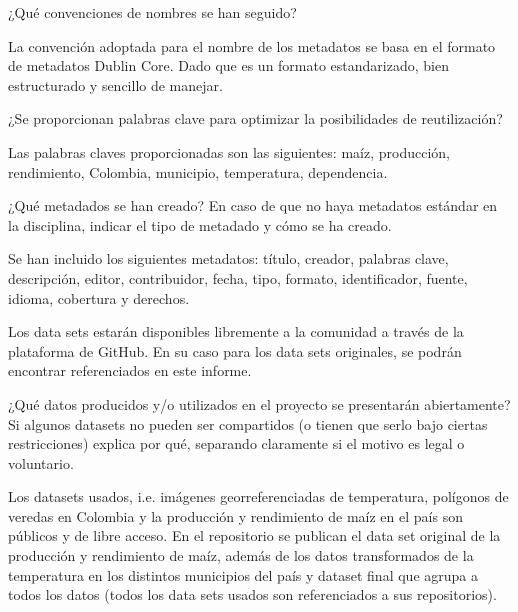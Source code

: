 \documentclass[12pt, spanish]{article}
\begin{document}
\begin{shaded}
¿Qué convenciones de nombres se han seguido?
\end{shaded}

La convención adoptada para el nombre de los metadatos se basa en el formato de metadatos Dublin Core. Dado que es un formato estandarizado, bien estructurado y sencillo de manejar.
\begin{shaded}
¿Se proporcionan palabras clave para optimizar la posibilidades de reutilización?
\end{shaded}
Las palabras claves proporcionadas son las siguientes: maíz, producción, rendimiento, Colombia, municipio, temperatura, dependencia.

\begin{shaded}
¿Qué metadados se han creado? En caso de que no haya metadatos estándar en la disciplina, indicar el tipo de metadado y cómo se ha creado.
\end{shaded}
Se han incluido los siguientes metadatos: título, creador, palabras clave, descripción, editor, contribuidor, fecha, tipo, formato, identificador, fuente, idioma, cobertura y derechos.


Los data sets estarán disponibles libremente a la comunidad a través de la plataforma de GitHub. En su caso para los data sets originales, se podrán encontrar referenciados en este informe.

\begin{shaded}
¿Qué datos producidos y/o utilizados en el proyecto se presentarán abiertamente? Si algunos datasets no pueden ser compartidos (o tienen que serlo bajo ciertas restricciones) explica por qué, separando claramente si el motivo es legal o voluntario. 
\end{shaded}
Los datasets usados, i.e. imágenes georreferenciadas de temperatura, polígonos de veredas en Colombia y la producción y rendimiento de maíz en el país son públicos y de libre acceso. En el repositorio se publican el data set original de la producción y rendimiento de maíz, además de los datos transformados de la temperatura en los distintos municipios del país y dataset final que agrupa a todos los datos (todos los data sets usados son referenciados a sus repositorios).\\
\end{document}
